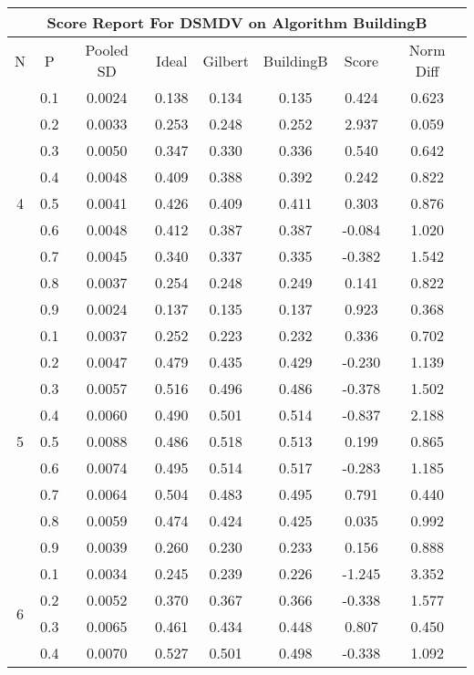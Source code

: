 \documentclass[11pt,a4paper]{report}
\begin{document}
\begin{longtable}{ | c | c || c | c | c | c | c | c | }
\hline
\multicolumn{8}{|c|}{ Score Report For DSMDV on Algorithm BuildingB} \\
\hline
N & P & Pooled SD &  Ideal &  Gilbert & BuildingB  & Score & Norm Diff \\
 \hline
 \hline
 \endhead
\multirow{9}{*}{4} & 0.1 & 0.0024 & 0.138 & 0.134 & 0.135 & 0.424 & 0.623 \\
 & 0.2 & 0.0033 & 0.253 & 0.248 & 0.252 & 2.937 & 0.059 \\
 & 0.3 & 0.0050 & 0.347 & 0.330 & 0.336 & 0.540 & 0.642 \\
 & 0.4 & 0.0048 & 0.409 & 0.388 & 0.392 & 0.242 & 0.822 \\
 & 0.5 & 0.0041 & 0.426 & 0.409 & 0.411 & 0.303 & 0.876 \\
 & 0.6 & 0.0048 & 0.412 & 0.387 & 0.387 & -0.084 & 1.020 \\
 & 0.7 & 0.0045 & 0.340 & 0.337 & 0.335 & -0.382 & 1.542 \\
 & 0.8 & 0.0037 & 0.254 & 0.248 & 0.249 & 0.141 & 0.822 \\
 & 0.9 & 0.0024 & 0.137 & 0.135 & 0.137 & 0.923 & 0.368 \\
 \hline
\multirow{9}{*}{5} & 0.1 & 0.0037 & 0.252 & 0.223 & 0.232 & 0.336 & 0.702 \\
 & 0.2 & 0.0047 & 0.479 & 0.435 & 0.429 & -0.230 & 1.139 \\
 & 0.3 & 0.0057 & 0.516 & 0.496 & 0.486 & -0.378 & 1.502 \\
 & 0.4 & 0.0060 & 0.490 & 0.501 & 0.514 & -0.837 & 2.188 \\
 & 0.5 & 0.0088 & 0.486 & 0.518 & 0.513 & 0.199 & 0.865 \\
 & 0.6 & 0.0074 & 0.495 & 0.514 & 0.517 & -0.283 & 1.185 \\
 & 0.7 & 0.0064 & 0.504 & 0.483 & 0.495 & 0.791 & 0.440 \\
 & 0.8 & 0.0059 & 0.474 & 0.424 & 0.425 & 0.035 & 0.992 \\
 & 0.9 & 0.0039 & 0.260 & 0.230 & 0.233 & 0.156 & 0.888 \\
 \hline
\multirow{9}{*}{6} & 0.1 & 0.0034 & 0.245 & 0.239 & 0.226 & -1.245 & 3.352 \\
 & 0.2 & 0.0052 & 0.370 & 0.367 & 0.366 & -0.338 & 1.577 \\
 & 0.3 & 0.0065 & 0.461 & 0.434 & 0.448 & 0.807 & 0.450 \\
 & 0.4 & 0.0070 & 0.527 & 0.501 & 0.498 & -0.338 & 1.092 \\

\end{longtable}
\end{document}
